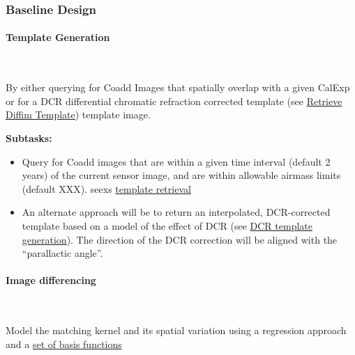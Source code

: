 \subsubsection{Baseline Design}
\label{sec:diffimDesign}

\paragraph{Template Generation}~

By either querying for Coadd Images that spatially overlap with a
given CalExp or for a DCR differential chromatic refraction corrected
template (see \hyperref[sec:acRetrieveTemplate]{Retrieve Diffim
  Template}) template image.

\noindent
{\bf Subtasks:}
\begin{itemize}
\item Query for Coadd images that are within a given time interval
  (default 2 years) of the current sensor image, and are within
  allowable airmass limits (default XXX). seexs
  \hyperref[sec:acRetrieveTemplate]{template retrieval}
\item An alternate approach will be to return an interpolated,
  DCR-corrected template based on a model of the effect of DCR (see
  \hyperref[sec:acDCRTemplates]{ DCR template generation}). The
  direction of the DCR correction will be aligned with the 
  ``parallactic angle''.
  \end{itemize}

\paragraph{Image differencing}~

Model the matching kernel and its spatial variation using a regression
approach and a \hyperref[sec:acImageSubtraction]{set of basis functions}

